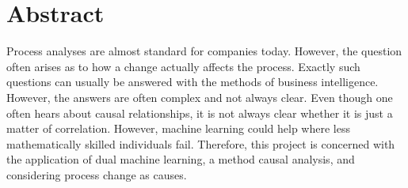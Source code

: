 \chapter*{Abstract}
Process analyses are almost standard for companies today. However, the question often arises as to how a change actually affects the process. Exactly such questions can usually be answered with the methods of business intelligence. However, the answers are often complex and not always clear. Even though one often hears about causal relationships, it is not always clear whether it is just a matter of correlation. However, machine learning could help where less mathematically skilled individuals fail. Therefore, this project is concerned with the application of dual machine learning, a method causal analysis, and considering process change as causes.
\clearpage

\ohead{\pagemark}

\tableofcontents

\listoffigures
{}

\listoftables
{}
\clearpage